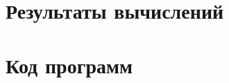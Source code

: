 \newpage
\section{ Результаты вычислений}
\label{c:app_results}





\newpage
\section{ Код программ}
\label{c:listings}
\renewcommand{\thelstlisting}{Г.1}

% 
\renewcommand{\thelstlisting}{Г.2}

\renewcommand{\thelstlisting}{Г.3}
